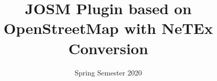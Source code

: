 \title  {JOSM Plugin based on OpenStreetMap with NeTEx Conversion}
\addresses  {\groupname\\\deptname\\\univname}
\date       {Spring Semester 2020}
\subject    {}
\keywords   {}

\maketitle